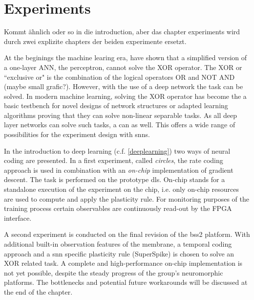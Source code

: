 \chapter{Experiments}
Kommt ähnlich oder so in die introduction, aber das chapter experiments wird durch zwei explizite chapters der beiden experimente ersetzt.


At the beginings the machine learing era, \cite{perceptron} have shown that a simplified version of a one-layer ANN, the perceptron, cannot solve the XOR operator. The XOR or ``exclusive or" is the combination of the logical operators OR and NOT AND (maybe small grafic?). However, with the use of a deep network the task can be solved. In modern machine learning, solving the XOR operator has become the a basic testbench for novel designs of network structures or adapted learning algorithms proving that they can solve non-linear separable tasks. As all deep layer networks can solve such tasks, a  can as well. This offers a wide range of possibilities for the experiment design with \glspl{snn}.

In the introduction to deep learning (c.f. \ref{deeplearning}) two ways of neural coding are presented. In a first experiment, called \textit{circles}, the rate coding approach is used in combination with an \textit{on-chip} implementation of gradient descent. The task is performed on the prototype \gls{dls}. On-chip stands for a standalone execution of the experiment on the chip, i.e. only on-chip resources are used to compute and apply the plasticity rule. For monitoring purposes of the training process certain observables are continuously read-out by the FPGA interface.

A second experiment is conducted on the final revision of the \gls{bss2} platform. With additional built-in observation features of the membrane, a temporal coding approach and a \gls{snn} specific plasticity rule (SuperSpike) is chosen to solve an XOR related task. A complete and high-performance on-chip implementation is not yet possible, despite the steady progress of the group's neuromorphic platforms. The bottlenecks and potential future workarounds will be discussed at the end of the chapter.\\

%
\newpage
